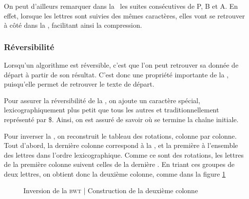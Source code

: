 On peut d'ailleurs remarquer dans la \bwt\ les suites consécutives de P, B et A. En effet, lorsque les lettres sont suivies des mêmes caractères, elles vont se retrouver à côté dans la \bwt, facilitant ainsi la compression.

\subsubsection{Réversibilité}
Lorsqu'un algorithme est réversible, c'est que l'on peut retrouver sa donnée de départ à partir de son résultat. C'est donc une propriété importante de la \bwt, puisqu'elle permet de retrouver le texte de départ.

Pour assurer la réversibilité de la \bwt, on ajoute un caractère spécial, lexicographiquement plus petit que tous les autres et traditionnellement représenté par \$. Ainsi, on est assuré de savoir où se termine la chaîne initiale.

Pour inverser la \bwt, on reconstruit le tableau des rotations, colonne par colonne.
Tout d'abord, la dernière colonne correspond à la \bwt, et la première à l'ensemble des lettres dans l'ordre lexicographique. Comme ce sont des rotations, les lettres de la première colonne suivent celles de la dernière . En triant ces groupes de deux lettres, on obtient donc la deuxième colonne, comme dans la figure \ref{unbwt}

\begin{figure}[h!]
\caption{Inversion de la \textsc{bwt} | Construction de la deuxième colonne }
\label{unbwt} 
\end{figure}

